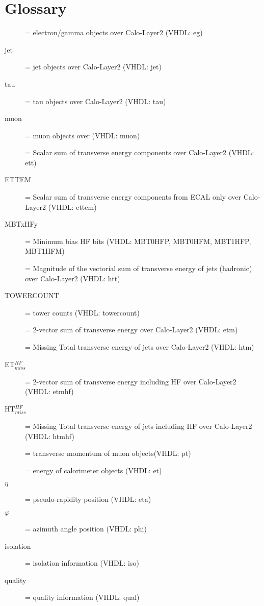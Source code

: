 %
\section{Glossary}
\label{sec:glossary}

\begin{description}
\item [{\egamma}] = electron/gamma objects over Calo-Layer2 (VHDL: eg)
\item [{jet}] = jet objects over Calo-Layer2 (VHDL: jet)
\item [{tau}] = tau objects over Calo-Layer2 (VHDL: tau)
\item [{muon}] = muon objects over \ugmt (VHDL: muon)
\item [{\ett}] = Scalar sum of transverse energy components over Calo-Layer2 (VHDL: ett)
\item [{ETTEM}] = Scalar sum of transverse energy components from ECAL only over Calo-Layer2 (VHDL: ettem)
\item [{MBTxHFy}] = Minimum bias HF bits (VHDL: MBT0HFP, MBT0HFM, MBT1HFP, MBT1HFM)
\item [{\htt}] = Magnitude of the vectorial sum of transverse energy of jets (hadronic) over Calo-Layer2 (VHDL: htt)
\item [{TOWERCOUNT}] = tower counts (VHDL: towercount)
\item [{\etm}] = 2-vector sum of transverse energy over Calo-Layer2 (VHDL: etm) 
\item [{\htm}] = Missing Total transverse energy of jets over Calo-Layer2 (VHDL: htm)
\item [{ET$_{miss}^{HF}$}] = 2-vector sum of transverse energy including HF over Calo-Layer2 (VHDL: etmhf) 
\item [{HT$_{miss}^{HF}$}] = Missing Total transverse energy of jets including HF over Calo-Layer2 (VHDL: htmhf)
\item [{\pt}] = transverse momentum of muon objects(VHDL: pt) 
\item [{\et}] = energy of calorimeter objects (VHDL: et) 
\item [{$\eta$}] = pseudo-rapidity position (VHDL: eta) 
\item [{$\varphi$}] = azimuth angle position (VHDL: phi) 
\item [{isolation}] = isolation information (VHDL: iso) 
\item [{quality}] = quality information (VHDL: qual) 
\end{description}

\clearpage

